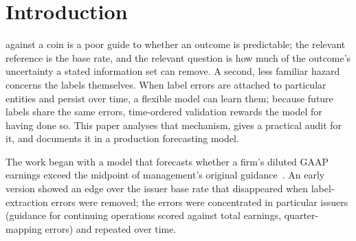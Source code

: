 \documentclass[journal]{IEEEtran}
\theoremstyle{definition}
\begin{document}
\section{Introduction}
 against a coin is a poor guide to whether an outcome is predictable; the relevant reference is the base rate, and the relevant question is how much of the outcome's uncertainty a stated information set can remove. A second, less familiar hazard concerns the labels themselves. When label errors are attached to particular entities and persist over time, a flexible model can learn them; because future labels share the same errors, time-ordered validation rewards the model for having done so. This paper analyses that mechanism, gives a practical audit for it, and documents it in a production forecasting model.

The work began with a model that forecasts whether a firm's diluted GAAP earnings exceed the midpoint of management's original guidance~\cite{ciconte2014midpoint}. An early version showed an edge over the issuer base rate that disappeared when label-extraction errors were removed; the errors were concentrated in particular issuers (guidance for continuing operations scored against total earnings, quarter-mapping errors) and repeated over time.
\end{document}
